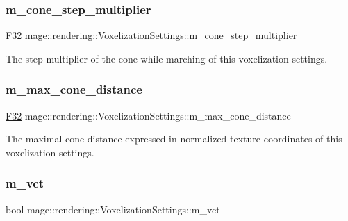\subsubsection{\texorpdfstring{m\+\_\+cone\+\_\+step\+\_\+multiplier}{m\_cone\_step\_multiplier}}
{\footnotesize\ttfamily \hyperlink{namespacemage_aa97e833b45f06d60a0a9c4fc22ae02c0}{F32} mage\+::rendering\+::\+Voxelization\+Settings\+::m\+\_\+cone\+\_\+step\+\_\+multiplier\hspace{0.3cm}{\ttfamily [private]}}

The step multiplier of the cone while marching of this voxelization settings. \hypertarget{classmage_1_1rendering_1_1_voxelization_settings_adb6172810eba8f59553bcbb9e2a7cbe3}{}\label{classmage_1_1rendering_1_1_voxelization_settings_adb6172810eba8f59553bcbb9e2a7cbe3} 
\subsubsection{\texorpdfstring{m\+\_\+max\+\_\+cone\+\_\+distance}{m\_max\_cone\_distance}}
{\footnotesize\ttfamily \hyperlink{namespacemage_aa97e833b45f06d60a0a9c4fc22ae02c0}{F32} mage\+::rendering\+::\+Voxelization\+Settings\+::m\+\_\+max\+\_\+cone\+\_\+distance\hspace{0.3cm}{\ttfamily [private]}}

The maximal cone distance expressed in normalized texture coordinates of this voxelization settings. \hypertarget{classmage_1_1rendering_1_1_voxelization_settings_ac2edf702f2441db192bef28ec616b873}{}\label{classmage_1_1rendering_1_1_voxelization_settings_ac2edf702f2441db192bef28ec616b873} 
\subsubsection{\texorpdfstring{m\+\_\+vct}{m\_vct}}
{\footnotesize\ttfamily bool mage\+::rendering\+::\+Voxelization\+Settings\+::m\+\_\+vct\hspace{0.3cm}{\ttfamily [private]}}

